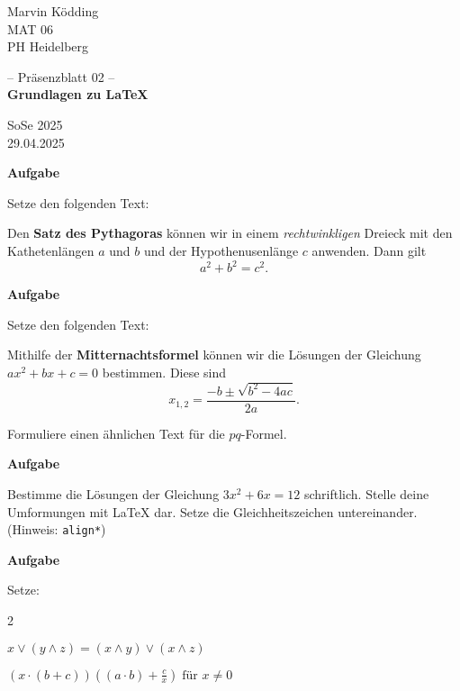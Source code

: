 \documentclass[a4paper, 12pt]{article}
\renewcommand{\date}{29.04.2025}
\newcommand{\klasse}{MAT 06}
\newcommand{\institute}{PH Heidelberg}
\newcommand{\topic}{Grundlagen zu \LaTeX}
\newcommand{\semester}{SoSe 2025}
\newcommand{\blatt}{02}
\newcounter{Aufgabe}
\newenvironment{aufgabe}{\addtocounter{Aufgabe}{1}%
	\textbf{Aufgabe \theAufgabe}
	
	\vspace*{-0.3em}}{\medskip}
\begin{document}
	\pagestyle{empty}
	\begin{minipage}{0.2\textwidth}
		Marvin Ködding\\\scriptsize \klasse\\\institute
	\end{minipage}
	\begin{minipage}{.6\textwidth}
		\centering
		-- Präsenzblatt \blatt{} --\\\textbf{\topic}
	\end{minipage}
	\begin{minipage}{.2\textwidth}
		\flushright \semester\\\scriptsize \date
	\end{minipage}
	
	\vspace*{1cm}
	
	\begin{aufgabe}
		Setze den folgenden Text:
		
		Den \textbf{Satz des Pythagoras} können wir in einem \textit{rechtwinkligen} Dreieck mit den Kathetenlängen $a$ und $b$ und der Hypothenusenlänge $c$ anwenden. Dann gilt \[a^2+b^2=c^2.\]
	\end{aufgabe}
	\begin{aufgabe}
		Setze den folgenden Text: 
		
		Mithilfe der \textbf{Mitternachtsformel} können wir die Lösungen der Gleichung $ax^2+bx+c=0$ bestimmen. Diese sind
		\[x_{1,2}=\frac{-b\pm\sqrt{b^2-4ac}}{2a}.\]
		
		
		Formuliere einen ähnlichen Text für die $pq$-Formel.
	\end{aufgabe}
	
	
	
	\begin{aufgabe}
		Bestimme die Lösungen der Gleichung $3x^2+6x=12$ schriftlich. Stelle deine Umformungen mit \LaTeX{} dar. Setze die Gleichheitszeichen untereinander. (Hinweis: \verb+align*+)
	\end{aufgabe}
	
	\begin{aufgabe}
		Setze:
		\begin{enumerate}
		\end{enumerate}
	\end{aufgabe}
	
\end{document}
